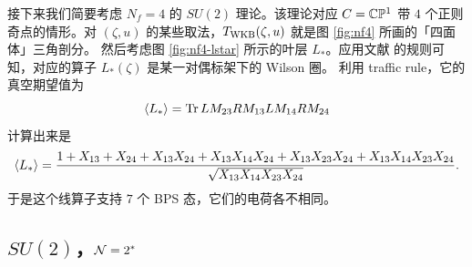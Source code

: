 接下来我们简要考虑 $N_f = 4$ 的 $SU(2)$ 理论。该理论对应 $C = \mathbb{C}\mathbb{P}^1$ 带 $4$ 个正则奇点的情形。对 $(\zeta, u)$ 的某些取法，$T_{\rm WKB}(\zeta, u)$ 就是图 \ref{fig:nf4} 所画的「四面体」三角剖分。
然后考虑图 \ref{fig:nf4-lstar} 所示的叶层 $L_*$。应用文献 \cite{Drukker:2009tz} 的规则可知，对应的算子 $L_*(\zeta)$ 是某一对偶标架下的 Wilson 圈。
利用 traffic rule，它的真空期望值为
%
\begin{equation}
\langle L_* \rangle = {\operatorname{Tr}} \, L M_{23} R M_{13} L M_{14} R M_{24}
\end{equation}
%
计算出来是
%
\begin{equation}\label{eq:Nf4-Wilson}
\langle L_* \rangle = \frac{1 + X_{13} + X_{24} + X_{13} X_{24} + X_{13} X_{14} X_{24} + X_{13} X_{23} X_{24} + X_{13} X_{14} X_{23} X_{24}}{\sqrt{X_{13} X_{14} X_{23} X_{24}}}.
\end{equation}
%
于是这个线算子支持 $7$ 个 BPS 态，它们的电荷各不相同。

\subsection{$SU(2)$，$\mathcal{N}=2^*$}\label{subsec:SU2-N2star-Examples}


